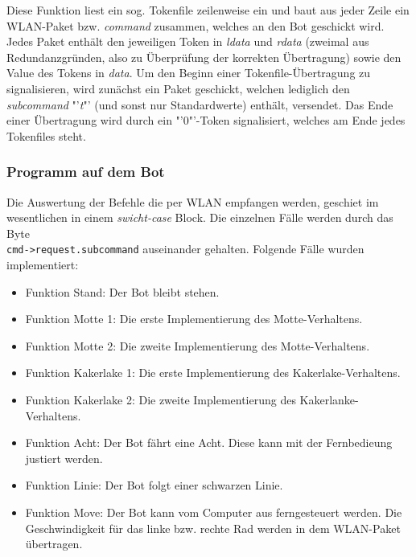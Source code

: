 \begin{itemize}
    Diese Funktion liest ein sog. Tokenfile zeilenweise ein und baut aus jeder Zeile ein WLAN-Paket bzw. \textit{command} zusammen, welches an den Bot geschickt wird. Jedes Paket enthält den jeweiligen Token in \textit{ldata} und \textit{rdata} (zweimal aus Redundanzgründen, also zu Überprüfung der korrekten Übertragung) sowie den Value des Tokens in \textit{data}. Um den Beginn einer Tokenfile-Übertragung zu signalisieren, wird zunächst ein Paket geschickt, welchen lediglich den \textit{subcommand} "'\textit{t}"' (und sonst nur Standardwerte) enthält, versendet. Das Ende einer Übertragung wird durch ein "'0"'-Token signalisiert, welches am Ende jedes Tokenfiles steht.
\end{itemize}


\subsubsection{Programm auf dem Bot}
\label{ctremote_bot}
Die Auswertung der Befehle die per WLAN empfangen werden, geschiet im wesentlichen
in einem \textit{swicht-case} Block. Die einzelnen Fälle werden durch das Byte \\
\verb+cmd->request.subcommand+ auseinander gehalten. Folgende Fälle wurden
implementiert:
\begin{itemize}
    \item Funktion Stand: Der Bot bleibt stehen.
    \item Funktion Motte 1: Die erste Implementierung des Motte-Verhaltens.
    \item Funktion Motte 2: Die zweite Implementierung des Motte-Verhaltens. 
    \item Funktion Kakerlake 1: Die erste Implementierung des Kakerlake-Verhaltens.
    \item Funktion Kakerlake 2: Die zweite Implementierung des Kakerlanke-Verhaltens.
    \item Funktion Acht: Der Bot fährt eine Acht. Diese kann mit der Fernbedieung justiert werden.
    \item Funktion Linie: Der Bot folgt einer schwarzen Linie.
    \item Funktion Move: Der Bot kann vom Computer aus ferngesteuert werden.
        Die Geschwindigkeit für das linke bzw. rechte Rad werden in dem WLAN-Paket übertragen.
\end{itemize}


